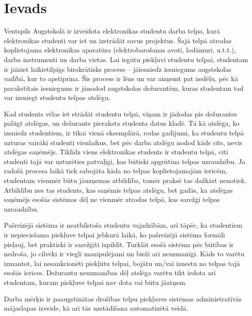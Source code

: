 \chapter*{Ievads}


Ventspils Augstskolā ir izveidota elektronikas studentu darba telpa, kurā elektronikas studenti var iet un izstrādāt savus projektus. Šajā telpā atrodas koplietojama elektronikas aparatūra (elektrobarošanas avoti, lodāmuri, u.t.t.), darba instrumenti un darba vietas. Lai iegūtu piekļuvi studentu telpai, studentam ir jāiziet laikietilpīgs birokrātisks process -- jāiesniedz iesniegums augstskolas vadībā, kur to apstiprina. Šis process ir lēns un var aizņemt pat nedēļu, pēc kā parakstītais iesniegums ir jānodod augstskolas dežurantēm, kuras studentam tad var izsniegt studentu telpas atslēgu.

Kad students vēlas iet strādāt studentu telpā, viņam ir jādodas pie dežurantes palūgt atslēgas, un dežurante pieraksta studenta datus kladē. Tā kā atslēga, ko izsniedz studentiem, ir tikai vienā eksemplārā, rodas gadījumi, ka studentu telpā uzturas vairāki studenti vienlaikus, bet pēc darba atslēgu nodod kāds cits, nevis atslēgas saņēmējs. Tiklīdz viens elektronikas students ir studentu telpā, citi studenti tajā var uzturēties patvaļīgi, kas būtiski apgrūtina telpas uzraudzību. Ja radošā procesa laikā tiek sabojāta kāda no telpas koplietojamajām ierīcēm, studentam vienmēr būtu jāuzņemas atbildība, tomēr praksē tas dažkārt nenotiek. Atbildību nes tas students, kas saņēmis telpas atslēgu, bet gadās, ka atslēgas saņēmējs esošās sistēmas dēļ ne vienmēr atrodas telpā, kas sarežģī telpas uzraudzību.

Pašreizējā sistēma ir neatbilstoša studentu vajadzībām, arī tāpēc, ka studentiem ir nepieciešama piekļuve telpai jebkurā laikā, ko pašreizējā sistēma formāli pieļauj, bet praktiski ir sarežģīti izpildīt. Turklāt esošā sistēma pēc būtības ir nedroša, jo cilvēki ir viegli manipulējami un bieži arī neuzmanīgi. Kāds to varētu izmantot, lai nesankcionēti piekļūtu telpai, bojātu un/vai iznestu no telpas tajā esošās ierīces. Dežurantu neuzmanības dēļ atslēga varētu tikt iedota arī studentam, kuram piekļuve telpai nav dota vai būtu jāatņem.

Darba mērķis ir paaugstinātas drošības telpu piekļuves sistēmas administratīvās mājaslapas izveide, kā arī tās uzstādīšana automatizētā veidā.


